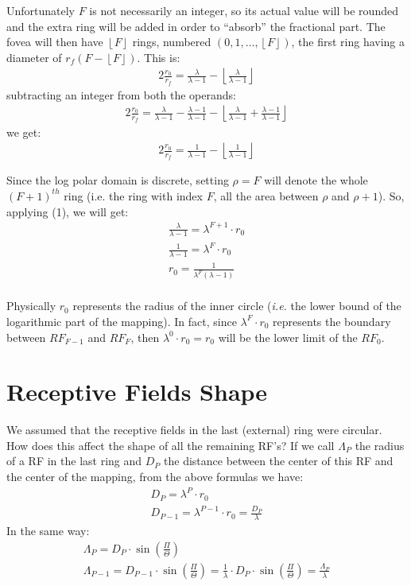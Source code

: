 \documentclass{article}
\begin{document}
Unfortunately $F$ is not necessarily an integer, so its actual value will be rounded and the extra ring will be added in order to ``absorb'' the fractional part. The fovea will then have $\left\lfloor F\right\rfloor$ rings, numbered $(0,1,\ldots,\left\lfloor F\right\rfloor)$,
 the first ring having a diameter of $r_{f}(F-\left\lfloor F\right\rfloor)$. This is:
\begin{eqnarray}
	2\frac{r_{0}}{r_{f}}=\frac{\lambda}{\lambda-1}-\left\lfloor\frac{\lambda}{\lambda-1}\right\rfloor
\end{eqnarray}
subtracting an integer from both the operands:
\begin{eqnarray}													
	2\frac{r_{0}}{r_{f}}=\frac{\lambda}{\lambda-1}-\frac{\lambda-1}{\lambda-1}- 					\left\lfloor\frac{\lambda}{\lambda-1}+\frac{\lambda-1}{\lambda-1}\right\rfloor
\end{eqnarray}
we get:
\begin{eqnarray}
	2\frac{r_{0}}{r_{f}}=\frac{1}{\lambda-1}-\left\lfloor\frac{1}{\lambda-1}\right\rfloor
\end{eqnarray}

Since the log polar domain is discrete, setting $\rho=F$ will denote the whole $(F+1)^{th}$ ring (i.e. the ring with index $F$, all the area between $\rho$ and $\rho+1$). So, applying (1),  we will get:
\begin{eqnarray}
	\frac{\lambda}{\lambda-1} = \lambda^{F+1} \cdot r_{0} \\
	\frac{1}{\lambda-1} = \lambda^{F} \cdot r_{0} \\
	r_{0}= \frac{1}{\lambda^{F}(\lambda-1)}\\
\end{eqnarray}

Physically $r_{0}$ represents the radius of the inner circle (\textit{i.e.} the lower bound of the logarithmic part of the mapping). In fact, since $\lambda^F \cdot r_{0}$ represents the boundary between $RF_{F-1}$ and $RF_{F}$, then $\lambda^0 \cdot r_{0}= r_{0}$ will be the lower limit of the $RF_{0}$.

\section{Receptive Fields Shape}
\label{sec:ReceptiveFieldsShape}

We assumed that the receptive fields in the last (external) ring were circular. How does this affect the shape of all the remaining RF's? If we call $\Lambda_P$ the radius of a RF in the last ring and $D_P$ the distance between the center of this RF and the center of the mapping, from the above formulas we have:
\begin{eqnarray}
	D_{P}=\lambda^{P} \cdot r_{0} \\
	D_{P-1}=\lambda^{P-1} \cdot r_{0}=\frac{D_{P}}{\lambda}
\end{eqnarray}
In the same way:
\begin{eqnarray}
	\Lambda_{P}=D_{P} \cdot \sin(\frac{\Pi}{\Theta}) \\
	\Lambda_{P-1}=D_{P-1} \cdot \sin(\frac{\Pi}{\Theta})=\frac{1}{\lambda}\cdot D_{P} \cdot \sin(\frac{\Pi}{\Theta})=\frac{\Lambda_{P}}{\lambda}
\end{eqnarray}
\end{document}
